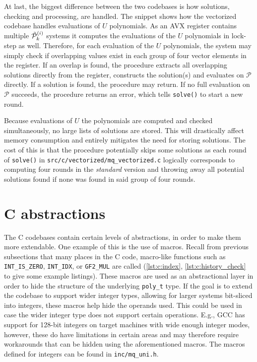 At last, the biggest difference between the two codebases is how solutions, checking and processing, are handled. The snippet 
shows how the vectorized codebase handles evaluations of $U$ polynomials. As an AVX register contains multiple $\Tilde{\mathcal{P}}^{(i)}_k$ systems it computes the evaluations of the $U$ polynomials in lock-step as well. Therefore, for each evaluation of the $U$ polynomials, the system may simply check if overlapping values exist in each group of four vector elements in the register. If an overlap is found, the procedure extracts all overlapping solutions directly from the register, constructs the solution(s) and evaluates on $\mathcal{P}$ directly. If a solution is found, the procedure may return. If no full evaluation on $\mathcal{P}$ succeeds, the procedure returns an error, which tells \texttt{solve()} to start a new round.

Because evaluations of $U$ the polynomials are computed and checked simultaneously, no large lists of solutions are stored. This will drastically affect memory consumption and entirely mitigates the need for storing solutions. The cost of this is that the procedure potentially skips some solutions as each round of \texttt{solve()} in \texttt{src/c/vectorized/mq\_vectorized.c} logically corresponds to computing four rounds in the \textit{standard} version and throwing away all potential solutions found if none was found in said group of four rounds. 

\section{C abstractions} \label{sec:impl:c_abstr}
The C codebases contain certain levels of abstractions, in order to make them more extendable. One example of this is the use of macros. Recall from previous subsections that many places in the C code, macro-like functions such as \texttt{INT\_IS\_ZERO}, \texttt{INT\_IDX}, or \texttt{GF2\_MUL} are called (\cref{lst:c:index}, \cref{lst:c:history_check} to give some example listings). These macros are used as an abstractional layer in order to hide the structure of the underlying \texttt{poly\_t} type. If the goal is to extend the codebase to support wider integer types, allowing for larger systems bit-sliced into integers, these macros help hide the operands used. This could be used in case the wider integer type does not support certain operations. E.g., GCC has support for 128-bit integers on target machines with wide enough integer modes, however, these do have limitations in certain areas and may therefore require workarounds that can be hidden using the aforementioned macros. The macros defined for integers can be found in \texttt{inc/mq\_uni.h}.

